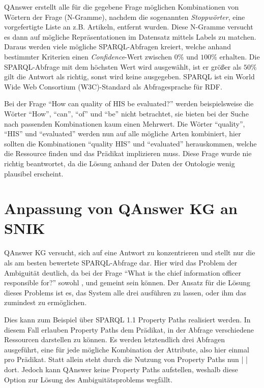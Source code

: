 \documentclass[utf8,biblatex]{lni}
\begin{document}
QAnswer erstellt alle für die gegebene Frage möglichen Kombinationen von Wörtern der Frage (N-Gramme), nachdem die sogenannten \emph{Stoppwörter}, eine vorgefertigte Liste an z.B. Artikeln, entfernt wurden.
Diese N-Gramme versucht es dann auf mögliche Repräsentationen im Datensatz mittels Labels zu matchen.
Daraus werden viele mögliche SPARQL-Abfragen kreiert, welche anhand bestimmter Kriterien einen \emph{Confidence}-Wert zwischen $0\%$ und $100\%$ erhalten.
Die SPARQL-Abfrage mit dem höchsten Wert wird ausgewählt, ist er größer als $50\%$ gilt die Antwort als richtig, sonst wird keine ausgegeben.
SPARQL ist ein World Wide Web Consortium (W3C)-Standard als Abfragesprache für RDF.

Bei der Frage \enquote{How can quality of HIS be evaluated?} werden beispielsweise die Wörter \enquote{How}, \enquote{can}, \enquote{of} und \enquote{be} nicht betrachtet, sie bieten bei der Suche nach passenden Kombinationen kaum einen Mehrwert.
Die Wörter \enquote{quality}, \enquote{HIS} und \enquote{evaluated} werden nun auf alle mögliche Arten kombiniert, hier sollten die Kombinationen \enquote{quality HIS} und \enquote{evaluated} herauskommen, welche die Ressource  finden und das Prädikat  implizieren muss.
Diese Frage wurde nie richtig beantwortet, da die Lösung anhand der Daten der Ontologie wenig plausibel erscheint.

\section{Anpassung von QAnswer KG an SNIK}

QAnswer KG versucht, sich auf eine Antwort zu konzentrieren und stellt nur die als am besten bewertete SPARQL-Abfrage dar.
Hier wird das Problem der Ambiguität deutlich, da bei der Frage \enquote{What is the chief information officer responsible for?} sowohl
,  und  gemeint sein können.
Der Ansatz für die Lösung dieses Problems ist es, das System alle drei ausführen zu lassen, oder ihm das zumindest zu ermöglichen.

Dies kann zum Beispiel über SPARQL 1.1 Property Paths realisiert werden.
In diesem Fall erlauben Property Paths dem Prädikat, in der Abfrage verschiedene Ressourcen darstellen zu können.
Es werden letztendlich drei Abfragen ausgeführt, eine für jede mögliche Kombination der Attribute, also hier einmal pro Prädikat.
Statt allein  steht durch die Nutzung von Property Paths nun  |  |  dort.
Jedoch kann QAnswer keine Property Paths aufstellen, weshalb diese Option zur Lösung des Ambiguitätsproblems wegfällt.
\end{document}
